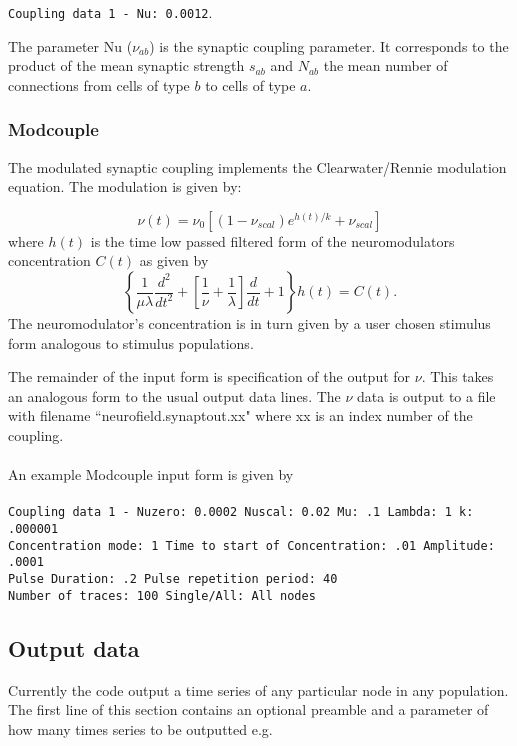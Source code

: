 \documentclass[12pt,a4paper]{article}
\begin{document}
{\tt \small Coupling data 1 - Nu: 0.0012}.

The parameter Nu ($\nu_{ab}$)
is the synaptic coupling
parameter. It corresponds to the product of the mean synaptic strength $s_{ab}$
and $N_{ab}$ the mean number of connections from cells of type $b$ to
cells of type $a$.

\subsubsection{Modcouple}

The modulated synaptic coupling implements the Clearwater/Rennie modulation
equation. The modulation is given by:

\begin{equation}
\nu (t) = \nu_0 \left[ ( 1 - \nu_{scal} ) e^{h(t)/k} + \nu_{scal} \right]
\end{equation}
where $h(t)$ is the time low passed filtered form of the neuromodulators concentration
$C(t)$ as given by
\begin{equation}
\left\{ \frac{1}{\mu \lambda} \frac{d^2}{dt^2} +
  \left[ \frac{1}{\nu}+ \frac{1}{\lambda} 
  \right]
  \frac{d}{dt} + 1
\right\}
h(t) = C(t).
\end{equation}
The neuromodulator's concentration is in turn given by a user chosen
stimulus form analogous to stimulus populations.

The remainder of the input form is specification of the output for $\nu$.
This takes an analogous form to the usual output data lines. The $\nu$
data is output to a file with filename ``neurofield.synaptout.xx" where xx is an index number
of the coupling.
\\
\\
An example Modcouple input form is given by
\\
\\
{\tt \small Coupling data 1  - Nuzero: 0.0002 Nuscal: 0.02 Mu: .1 Lambda: 1 k: .000001 \\
 Concentration mode: 1  Time to start of Concentration: .01 Amplitude: .0001\\
 Pulse Duration: .2 Pulse repetition period: 40 \\
 Number of traces: 100  Single/All: All nodes}


\subsection{Output data}
Currently the code output a time series of any particular node in any population.
The first line of this section contains an optional preamble and a parameter
of how many times series to be outputted e.g.
\end{document}
